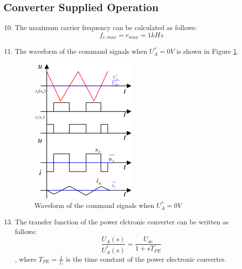 \documentclass[12pt,a4paper, openany]{book}
\begin{document}
\subsection{Converter Supplied Operation}

\begin{enumerate}
\setcounter{enumi}{9} %
\item {\bf *} The maximum carrier frequency can be calculated as follows:
\begin{equation}
    f_{c,max} = r_{max} = 1kHz
\end{equation}
\item {\bf *} The waveform of the command signals when $U^*_A=0V$ is shown in Figure \ref{fig:Waveform of the command signals when $U^*_A=0V$}.
\begin{figure}[H]
    \centering
    \includegraphics[width=0.5\textwidth]{figures/PWM.png}
    \caption{Waveform of the command signals when $U^*_A=0V$}
    \label{fig:Waveform of the command signals when $U^*_A=0V$}
\end{figure}
\end{enumerate}

\begin{enumerate}
\setcounter{enumi}{12} %
\item {\bf *} The transfer function of the power elctronic converter can be written as follows:
\begin{equation}
    \frac{U_A(s)}{U^*_A(s)} = \frac{U_{dc}}{1 + sT_{PE}}
\end{equation}
, where $T_{PE}=\frac{1}{f_c}$ is the time constant of the power electronic converter.
\end{enumerate}
\end{document}

